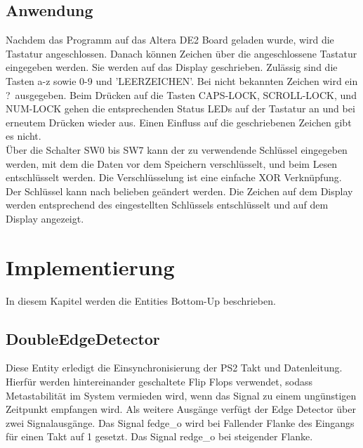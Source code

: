 \documentclass[a4paper,12pt]{report}
\newcommand{\au}{\glqq}
\newcommand{\ao}{\grqq\ } %
\begin{document}
	\section{Anwendung}
		Nachdem das Programm auf das Altera DE2 Board geladen wurde, wird die Tastatur angeschlossen. 
		Danach können Zeichen über die angeschlossene Tastatur eingegeben werden. Sie werden auf das Display geschrieben. Zulässig sind die Tasten a-z sowie 0-9 und 'LEERZEICHEN'. Bei nicht bekannten Zeichen wird ein \au ?\ao ausgegeben.	 
		Beim Drücken auf die Tasten CAPS-LOCK, SCROLL-LOCK, und NUM-LOCK gehen die entsprechenden Status LEDs auf der Tastatur an und bei erneutem Drücken wieder aus. Einen Einfluss auf die geschriebenen Zeichen gibt es nicht.\\
		Über die Schalter SW0 bis SW7 kann der zu verwendende Schlüssel eingegeben werden, mit dem die Daten vor dem Speichern verschlüsselt, und beim Lesen entschlüsselt werden. Die Verschlüsselung ist eine einfache XOR Verknüpfung. Der Schlüssel kann nach belieben geändert werden. Die Zeichen auf dem Display werden entsprechend des eingestellten Schlüssels entschlüsselt und auf dem Display angezeigt.

\chapter{Implementierung}
	In diesem Kapitel werden die Entities Bottom-Up beschrieben.

	\section{DoubleEdgeDetector}
		Diese Entity erledigt die Einsynchronisierung der PS2 Takt und Datenleitung. Hierfür werden hintereinander geschaltete Flip Flops verwendet, sodass Metastabilität im System vermieden wird, wenn das Signal zu einem ungünstigen Zeitpunkt empfangen wird. Als weitere Ausgänge verfügt der Edge Detector über zwei Signalausgänge. Das Signal fedge\_o wird bei Fallender Flanke des Eingangs für einen Takt auf 1 gesetzt. Das Signal redge\_o bei steigender Flanke.
		
\end{document}
